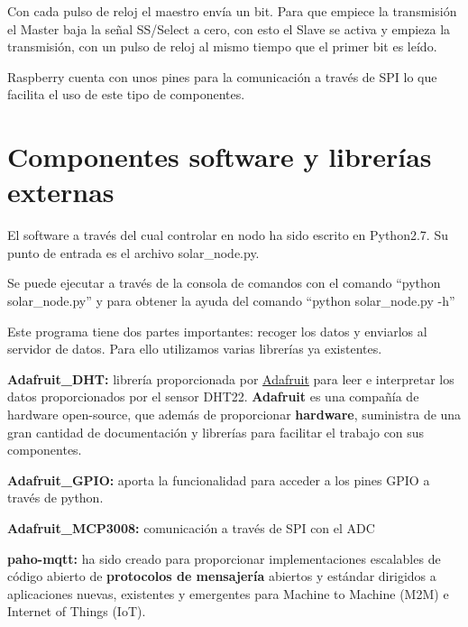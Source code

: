 Con cada pulso de reloj el maestro envía un bit. Para que empiece la transmisión el Master baja la señal SS/Select a cero, con esto el Slave se activa y empieza la transmisión, con un pulso de reloj al mismo tiempo que el primer bit es leído.

Raspberry cuenta con unos pines para la comunicación a través de SPI lo que facilita el uso de este tipo de componentes.

\section{Componentes software y librerías externas}
El software a través del cual controlar en nodo ha sido escrito en Python2.7. Su punto de entrada es el archivo solar\_node.py.

Se puede ejecutar a través de la consola de comandos con el comando ``python solar\_node.py'' y para obtener la ayuda del comando ``python solar\_node.py -h''

Este programa tiene dos partes importantes: recoger los datos y enviarlos al servidor de datos. Para ello utilizamos varias librerías ya existentes.

\begin{description}  
\item \textbf{Adafruit\_DHT:} librería proporcionada por \href{https://www.adafruit.com/}{Adafruit} para leer e interpretar los datos proporcionados por el sensor DHT22. \textbf{Adafruit} es una compañía de hardware open-source, que además de proporcionar \textbf{hardware}, suministra de una gran cantidad de documentación y librerías para facilitar el trabajo con sus componentes. 
\item \textbf{Adafruit\_GPIO:} aporta la funcionalidad para acceder a los pines GPIO a través de python.
\item \textbf{Adafruit\_MCP3008:} comunicación a través de SPI con el ADC
\item \textbf{paho-mqtt:}  ha sido creado para proporcionar implementaciones escalables de código abierto de \textbf{protocolos de mensajería} abiertos y estándar dirigidos a aplicaciones nuevas, existentes y emergentes para Machine to Machine (M2M) e Internet of Things (IoT).
\end{description}

